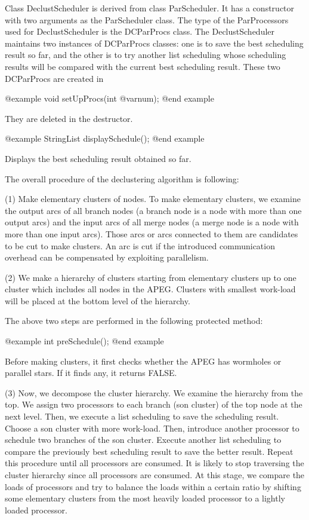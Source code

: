Class DeclustScheduler is derived from class ParScheduler. It has a
constructor with two arguments as the ParScheduler class.
The type of the ParProcessors used for DeclustScheduler is the DCParProcs
class. The DeclustScheduler maintains two instances of DCParProcs classes:
one is to save the best scheduling result so far, and the other is to
try another list scheduling whose scheduling results will be compared with
the current best scheduling result. These two DCParProcs are created in

@example
void setUpProcs(int @var{num});
@end example

They are deleted in the destructor.

@example
StringList displaySchedule();
@end example

Displays the best scheduling result obtained so far.

The overall procedure of the declustering algorithm is following:

(1) Make elementary clusters of nodes. To make elementary clusters, we examine
the output arcs of all branch nodes (a branch node is a node with more than
one output arcs) and the input arcs of all merge nodes (a merge node is a
node with more than one input arcs). Those arcs or arcs connected to them
are candidates to be cut to make clusters. An arc is cut if the
introduced communication overhead can be compensated by exploiting
parallelism.

(2) We make a hierarchy of clusters starting from elementary clusters up
to one cluster which includes all nodes in the APEG. Clusters with
smallest work-load will be placed at the bottom level of the hierarchy.

The above two steps are performed in the following protected method:

@example
int preSchedule();
@end example

Before making clusters, it first checks whether the APEG has wormholes or
parallel stars. If it finds any, it returns FALSE.

(3) Now, we decompose the cluster hierarchy. We examine the hierarchy from
the top. We assign two processors to each branch (son cluster) of the top node 
at the next level. Then, we execute a list scheduling to save 
the scheduling result. Choose a son cluster with more work-load. 
Then, introduce another processor to schedule two branches of the son cluster.
Execute another list scheduling to compare the previously best scheduling
result to save the better result. Repeat this procedure until all processors
are consumed. It is likely to stop traversing the cluster hierarchy since
all processors are consumed. At this stage, we compare the loads of
processors and try to balance the loads within a certain
ratio by shifting some elementary clusters
from the most heavily loaded processor to a lightly loaded processor.

